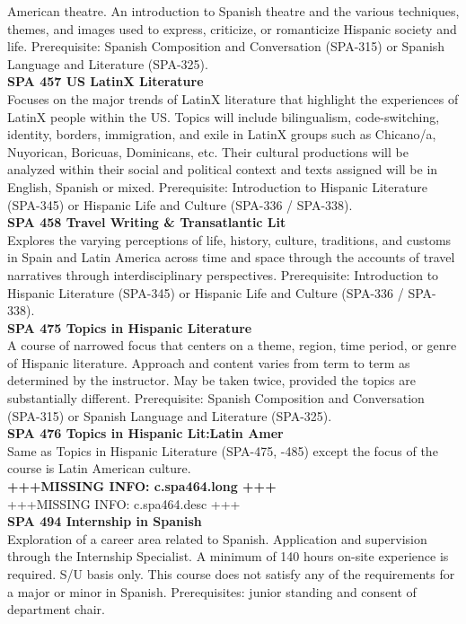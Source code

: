 \documentclass[
  letterpaper,
]{scrbook}
\begin{document}
American theatre. An introduction to Spanish theatre and the various
techniques, themes, and images used to express, criticize, or
romanticize Hispanic society and life. Prerequisite: Spanish Composition
and Conversation (SPA-315) or Spanish Language and Literature
(SPA-325).\\
\textbf{SPA 457 US LatinX Literature}\\
Focuses on the major trends of LatinX literature that highlight the
experiences of LatinX people within the US. Topics will include
bilingualism, code-switching, identity, borders, immigration, and exile
in LatinX groups such as Chicano/a, Nuyorican, Boricuas, Dominicans,
etc. Their cultural productions will be analyzed within their social and
political context and texts assigned will be in English, Spanish or
mixed. Prerequisite: Introduction to Hispanic Literature (SPA-345) or
Hispanic Life and Culture (SPA-336 / SPA-338).\\
\textbf{SPA 458 Travel Writing \& Transatlantic Lit}\\
Explores the varying perceptions of life, history, culture, traditions,
and customs in Spain and Latin America across time and space through the
accounts of travel narratives through interdisciplinary perspectives.
Prerequisite: Introduction to Hispanic Literature (SPA-345) or Hispanic
Life and Culture (SPA-336 / SPA-338).\\
\textbf{SPA 475 Topics in Hispanic Literature}\\
A course of narrowed focus that centers on a theme, region, time period,
or genre of Hispanic literature. Approach and content varies from term
to term as determined by the instructor. May be taken twice, provided
the topics are substantially different. Prerequisite: Spanish
Composition and Conversation (SPA-315) or Spanish Language and
Literature (SPA-325).\\
\textbf{SPA 476 Topics in Hispanic Lit:Latin Amer}\\
Same as Topics in Hispanic Literature (SPA-475, -485) except the focus
of the course is Latin American culture.\\
\textbf{+++MISSING INFO: c.spa464.long +++}\\
+++MISSING INFO: c.spa464.desc +++\\
\textbf{SPA 494 Internship in Spanish}\\
Exploration of a career area related to Spanish. Application and
supervision through the Internship Specialist. A minimum of 140 hours
on-site experience is required. S/U basis only. This course does not
satisfy any of the requirements for a major or minor in Spanish.
Prerequisites: junior standing and consent of department chair.
\end{document}

